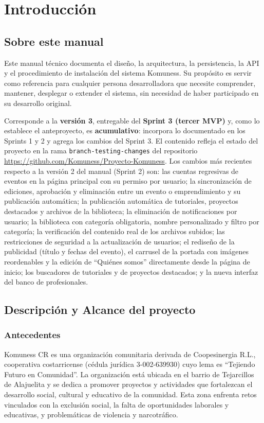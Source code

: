 \chapter{Introducción}

\section{Sobre este manual}
Este manual técnico documenta el diseño, la arquitectura, la persistencia, la API y el procedimiento de instalación del sistema Komuness. Su propósito es servir como referencia para cualquier persona desarrolladora que necesite comprender, mantener, desplegar o extender el sistema, sin necesidad de haber participado en su desarrollo original.

Corresponde a la \textbf{versión 3}, entregable del \textbf{Sprint 3 (tercer MVP)} y, como lo establece el anteproyecto, es \textbf{acumulativo}: incorpora lo documentado en los Sprints 1 y 2 y agrega los cambios del Sprint 3. El contenido refleja el estado del proyecto en la rama \texttt{branch-testing-changes} del repositorio \url{https://github.com/Komuness/Proyecto-Komuness}. Los cambios más recientes respecto a la versión 2 del manual (Sprint 2) son: las cuentas regresivas de eventos en la página principal con su permiso por usuario; la sincronización de ediciones, aprobación y eliminación entre un evento o emprendimiento y su publicación automática; la publicación automática de tutoriales, proyectos destacados y archivos de la biblioteca; la eliminación de notificaciones por usuario; la biblioteca con categoría obligatoria, nombre personalizado y filtro por categoría; la verificación del contenido real de los archivos subidos; las restricciones de seguridad a la actualización de usuarios; el rediseño de la publicidad (título y fechas del evento), el carrusel de la portada con imágenes reordenables y la edición de ``Quiénes somos'' directamente desde la página de inicio; los buscadores de tutoriales y de proyectos destacados; y la nueva interfaz del banco de profesionales.

\section{Descripción y Alcance del proyecto}
\subsection{Antecedentes}
Komuness CR es una organización comunitaria derivada de Coopesinergia R.L., cooperativa costarricense (cédula jurídica 3-002-639930) cuyo lema es ``Tejiendo Futuro en Comunidad''. La organización está ubicada en el barrio de Tejarcillos de Alajuelita y se dedica a promover proyectos y actividades que fortalezcan el desarrollo social, cultural y educativo de la comunidad. Esta zona enfrenta retos vinculados con la exclusión social, la falta de oportunidades laborales y educativas, y problemáticas de violencia y narcotráfico.

